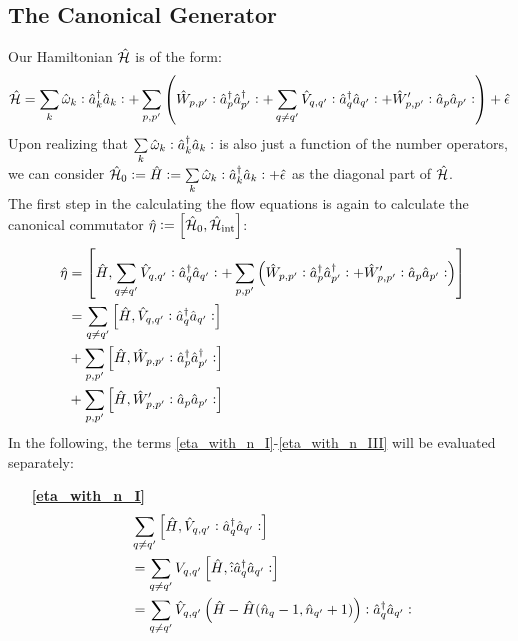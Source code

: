 \begin{appendix}
\subsection{The Canonical Generator}
Our Hamiltonian $\hat{\mathcal{H}}$ is of the form:
\begin{align}
\hat{\mathcal{H}} = \sum\limits_k \hat\omega_k \vcentcolon\hat a^\dagger_k\hat a_k\vcentcolon+\sum\limits_{p,p^\prime}\left(\hat W_{p,p^\prime}\vcentcolon \hat a^\dagger_p\hat a^\dagger_{p^\prime}\vcentcolon+\sum\limits_{q\neq q^\prime}\hat V_{q,q^\prime}\vcentcolon \hat a^\dagger_q\hat a_{q^\prime}\vcentcolon+\hat W_{p,p^\prime}^\prime\vcentcolon\hat a_p\hat a_{p^\prime}\vcentcolon\right)+\hat\epsilon
\end{align}
Upon realizing that $\sum\limits_k \hat\omega_k \vcentcolon\hat a^\dagger_k\hat a_k\vcentcolon$ is also just a function of the number operators, we can consider $\hat{\mathcal{H}}_0\vcentcolon=\hat H\vcentcolon= \sum\limits_k \hat\omega_k \vcentcolon\hat a^\dagger_k\hat a_k\vcentcolon+\hat\epsilon$ as the diagonal part of $\hat{\mathcal{H}}$. \\
The first step in the calculating the flow equations is again to calculate the canonical commutator $\hat\eta\vcentcolon=\left[\hat{\mathcal{H}}_0,\hat{\mathcal{H}}_{\mathrm{int}}\right]$:
\begin{subequations}
\begin{align}
\hat\eta &= \left[\hat H,\sum\limits_{q\neq q^\prime}\hat V_{q,q^\prime}\vcentcolon \hat a^\dagger_q\hat a_{q^\prime}\vcentcolon+\sum\limits_{p,p^\prime}\left(\hat W_{p,p^\prime}\vcentcolon \hat a^\dagger_p\hat a^\dagger_{p^\prime}\vcentcolon+\hat W_{p,p^\prime}^\prime\vcentcolon\hat a_p\hat a_{p^\prime}\vcentcolon\right)\right]  \nonumber\\ \quad& 
=  \sum\limits_{q\neq q^\prime}\left[\hat H,\hat V_{q,q^\prime}\vcentcolon \hat a^\dagger_q\hat a_{q^\prime}\vcentcolon\right] \label{eta_with_n_I}\\ \quad& 
+ \sum\limits_{p,p^\prime}\left[\hat H,\hat W_{p,p^\prime}\vcentcolon \hat a^\dagger_p\hat a^\dagger_{p^\prime}\vcentcolon\right] \label{eta_with_n_II} \\ \quad& 
+ \sum\limits_{p,p^\prime}\left[\hat H,\hat W_{p,p^\prime}^\prime\vcentcolon\hat a_p\hat a_{p^\prime} \vcentcolon \right] \label{eta_with_n_III}
\end{align}
\end{subequations}
In the following, the terms \ref{eta_with_n_I}-\ref{eta_with_n_III} will be evaluated separately:
\begin{itemize}
\item[\textbf{\ref{eta_with_n_I}}] 
\begin{align}
&\Sum_{q\neq q^\prime}\left[\hat H,\hat V_{q,q^\prime}\NO \CR_q\AN_{q^\prime}\NO\right]\nonumber\\
&= \Sum_{q\neq q^\prime}V_{q,q^\prime}\left[\hat H,\hat \NO \CR_q\AN_{q^\prime}\NO\right] \nonumber \\ 
&=  \Sum_{q\neq q^\prime}\hat V_{q,q^\prime} \left(\hat H - \hat H(\hat n_q-1,\hat n_{q^\prime}+1)\right) \NO \CR_q\AN_{q^\prime}\NO \\

\end{align}
\end{itemize}
\end{appendix}

